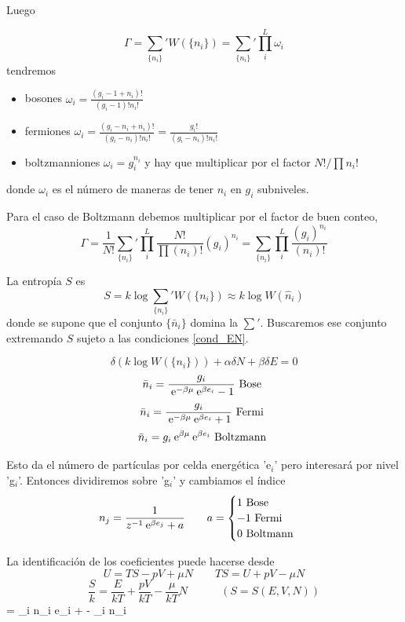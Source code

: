 \documentclass[10pt,oneside]{CBFT_book}
\begin{document}
Luego

\[
	\Gamma = \sum_{ \{ n_i \} }' W(\{ n_i \}) = \sum_{ \{ n_i \} }' \prod_i^L  \omega_i 
\]
tendremos
\begin{itemize}
 \item bosones $ \omega_i = \frac{ ( g_i - 1 + n_i)! }{ (g_i - 1)!n_i!} $
 \item fermiones $ \omega_i = \frac{ ( g_i - n_i + n_i )! }{ (g_i - n_i)!n_i!} =
		\frac{ g_i! }{ (g_i -n_i )! n_i!}$
 \item boltzmanniones $ \omega_i = g_i^{n_i} $ y hay que multiplicar por el factor
		$ N! / \prod n_i! $
\end{itemize}
donde $ \omega_i $ es el número de maneras de tener $ n_i $ en $ g_i $ subniveles.

Para el caso de Boltzmann debemos multiplicar por el factor de buen conteo,
\[
	\Gamma = \frac{1}{N!} \sum_{ \{ n_i \} }' \prod_i^L \frac{N!}{\prod (n_i)!}(g_i)^{n_i}
	= \sum_{ \{ n_i \} } \prod_i^L \frac{ (g_i)^{n_i} }{ (n_i)! }
\]

La entropía $S$ es
\[
	S = k \log \sum_{ \{ n_i \} }' W ( \{ n_i \} ) \approx k \log W( \hat{n}_i )
\]
donde se supone que el conjunto $ \{ \bar{n}_i \}$ domina la $ \sum' $. Buscaremos ese conjunto
extremando $S$ sujeto a las condiciones \eqref{cond_EN}.

\[
	\delta ( k\log W( \{ n_i \} ) ) + \alpha \delta N + \beta \delta E = 0
\]
\[
	\bar{n}_i = \frac{ g_i }{ \:\mathrm{e}^{ -\beta \mu } \:\mathrm{e}^{ \beta e_i } - 1 } \text{ Bose }
\]
\[
	\bar{n}_i = \frac{ g_i }{ \:\mathrm{e}^{ -\beta \mu } \:\mathrm{e}^{ \beta e_i } + 1 } \text{ Fermi }
\]
\[
	\bar{n}_i =  g_i \:\mathrm{e}^{ \beta \mu } \:\mathrm{e}^{ \beta e_i } \text{ Boltzmann }
\]

Esto da el número de partículas por celda energética 'e$_i$' pero interesará por nivel 'g$_i$'.
Entonces dividiremos sobre 'g$_i$' y cambiamos el índice 
\[
	n_j = \frac{1}{z^{-1}\:\mathrm{e}^{\beta e_j} + a} \qquad 
	a = \begin{cases}
	 1 \text{ Bose } \\
	 -1 \text{ Fermi } \\
	 0 \text{ Boltmann }
	\end{cases}
\]

La identificación de los coeficientes puede hacerse desde 
\[
	U = TS - pV + \mu N \qquad TS = U  + pV - \mu N
\]
\[
	\frac{S}{k} = \frac{E}{kT} + \frac{pV}{kT} - \frac{\mu}{kT}N \qquad 
	\quad (S=S(E,V,N))
\]
\be
	 =  \sum_i n_i e_i +  -  \sum_i n_i
	\label{entropiaSoverk}
\ee
\end{document}
